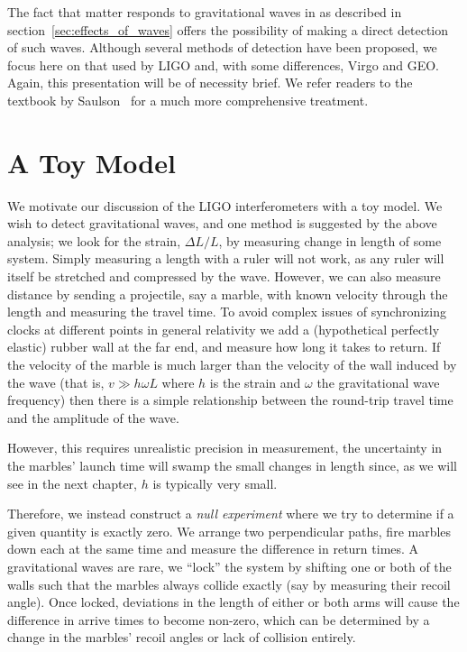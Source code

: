 The fact that matter responds to gravitational waves in as described
in section~\ref{sec:effects_of_waves} offers the possibility of making
a direct detection of such waves.  Although several methods of
detection have been proposed, we focus here on that used by LIGO and,
with some differences, Virgo and GEO.  Again, this presentation will
be of necessity brief.  We refer readers to the textbook by
Saulson~\cite{Saulson:1994} for a much more comprehensive
treatment.

\section{A Toy Model}

We motivate our discussion of the LIGO interferometers with a toy
model.  We wish to detect gravitational waves, and one method is
suggested by the above analysis; we look for the strain, $\Delta L/L$,
by measuring change in length of some system.  Simply measuring a
length with a ruler will not work, as any ruler will itself be
stretched and compressed by the wave.  However, we can also measure
distance by sending a projectile, say a marble, with known
velocity through the length and measuring the travel time.  To avoid
complex issues of synchronizing clocks at different points in general
relativity we add a (hypothetical perfectly elastic) rubber wall at
the far end, and measure how long it takes to return.  If the velocity
of the marble is much larger than the velocity of the wall induced by
the wave (that is, $v \gg h \omega L$ where $h$ is the strain and
$\omega$ the gravitational wave frequency) then there is a simple
relationship between the round-trip travel time and the amplitude of
the wave.

However, this requires unrealistic precision in measurement, the
uncertainty in the marbles' launch time will swamp the small changes in 
length since, as we will see in the next chapter, $h$ is typically
very small.

Therefore, we instead construct a \emph{null experiment} where we try
to determine if a given quantity is exactly zero.  We arrange two
perpendicular paths, fire marbles down each at the same time and
measure the difference in return times.  A gravitational waves are
rare, we ``lock'' the system by shifting one or both of the walls such
that the marbles always collide exactly (say by measuring their recoil
angle).  Once locked, deviations in the length of either or both arms
will cause the difference in arrive times to become non-zero, which
can be determined by a change in the marbles' recoil angles or lack of
collision entirely.

